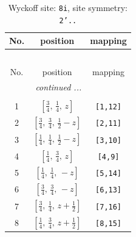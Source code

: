 \documentclass[fleqn,8pt]{jsarticle}
\begin{document}
\begin{longtable}{ccc}
\caption{Wyckoff site: {\tt 8i}, site symmetry: {\tt 2'..}}
 \\
 \hline \hline
No. & position & mapping \\ \hline \endfirsthead

\multicolumn{2}{l}{\tablename\ \thetable{}} \\
 \hline \hline
No. & position & mapping \\ \hline \endhead

 \hline \hline
\multicolumn{2}{r}{\footnotesize\it continued ...} \\ \endfoot

 \hline \hline
\multicolumn{2}{r}{} \\ \endlastfoot

1 & $\left[ \frac{3}{4},\, \frac{1}{4},\, z \right]$ & {\tt [1,12]} \\ \hline
2 & $\left[ \frac{3}{4},\, \frac{3}{4},\, \frac{1}{2} - z \right]$ & {\tt [2,11]} \\ \hline
3 & $\left[ \frac{1}{4},\, \frac{1}{4},\, \frac{1}{2} - z \right]$ & {\tt [3,10]} \\ \hline
4 & $\left[ \frac{1}{4},\, \frac{3}{4},\, z \right]$ & {\tt [4,9]} \\ \hline
5 & $\left[ \frac{1}{4},\, \frac{1}{4},\, - z \right]$ & {\tt [5,14]} \\ \hline
6 & $\left[ \frac{3}{4},\, \frac{3}{4},\, - z \right]$ & {\tt [6,13]} \\ \hline
7 & $\left[ \frac{3}{4},\, \frac{1}{4},\, z + \frac{1}{2} \right]$ & {\tt [7,16]} \\ \hline
8 & $\left[ \frac{1}{4},\, \frac{3}{4},\, z + \frac{1}{2} \right]$ & {\tt [8,15]} \\
\end{longtable}
\renewcommand{\arraystretch}{1.2}
\end{document}
